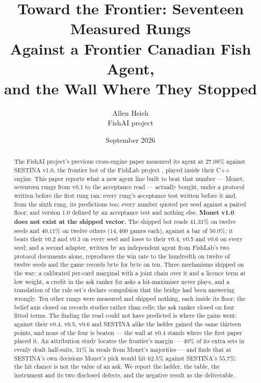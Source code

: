 \documentclass[11pt]{article}
\title{Toward the Frontier: Seventeen Measured Rungs\\ Against a Frontier Canadian Fish Agent,\\ and the Wall Where They Stopped}
\author{Allen Hsieh\\[2pt] {\small FishAI project}}
\date{September 2026}
\begin{document}
\maketitle

\begin{abstract}
\noindent
The FishAI project's previous cross-engine paper \cite{frontier} measured its agent at $27.08\%$
against SESTINA v1.0, the frontier bot of the FishLab project \cite{fishlab}, played inside their
C++ engine. This paper reports what a new agent line built to beat that number --- Monet, seventeen
rungs from v0.1 to the acceptance read --- actually bought, under a protocol written before the
first rung ran: every rung's acceptance test written before it and, from the sixth rung, its
predictions too; every number quoted per seed against a paired floor; and version 1.0 defined by an
acceptance test and nothing else. \textbf{Monet v1.0
does not exist at the shipped vector.} The shipped bot reads $41.31\%$ on twelve seeds and
$40.11\%$ on twelve others ($14{,}400$ games each), against a bar of $50.0\%$; it beats their v0.2
and v0.3 on every seed and loses to their v0.4, v0.5 and v0.6 on every seed; and a second adapter,
written by an independent agent from FishLab's two protocol documents alone, reproduces the win rate
to the hundredth on twelve of twelve seeds and the game records byte for byte on ten. Three
mechanisms shipped on the way: a calibrated per-card marginal with a joint chain over it and a
licence term at low weight, a credit in the ask ranker for asks a hit-maximiser never plays, and a
translation of the rule set's declare compulsion that the bridge had been answering wrongly.
Ten other rungs were measured and shipped nothing, each inside its floor; the belief axis
closed on records studies rather than cells; the ask ranker closed on four fitted terms. The
finding the read could not have predicted is where the gains went: against their v0.4, v0.5,
v0.6 and SESTINA alike the ladder gained the same thirteen points, and none of the four is beaten
--- the wall at v0.4 stands where the first paper placed it. An attribution study locates the
frontier's margin --- $40\%$ of its extra sets in evenly dealt half-suits, $31\%$ in steals from
Monet's majorities --- and finds that at SESTINA's own decisions Monet's pick would hit $62.5\%$
against SESTINA's $55.7\%$: the hit chance is not the value of an ask. We report the ladder, the
table, the instrument and its two disclosed defects, and the negative result as the deliverable.
\end{abstract}
\end{document}

